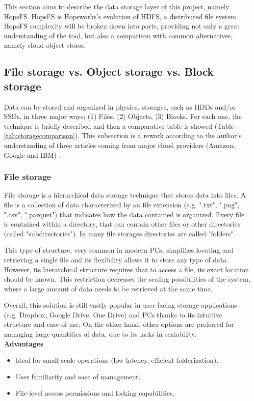 This section aims to describe the data storage layer of this project, namely HopsFS. HopsFS is Hopsworks's evolution of \gls{HDFS}, a distributed file system. HopsFS complexity will be broken down into parts, providing not only a great understanding of the tool, but also a comparison with common alternatives, namely cloud object stores.

\subsection{File storage vs. Object storage vs. Block storage}

Data can be stored and organized in physical storages, such as \glspl{HDD} and/or \glspl{SSD}, in three major ways: (1) Files, (2) Objects, (3) Blocks. For each one, the technique is briefly described and then a comparative table is showed (Table \ref{tab:storagecomparison}). This subsection is a rework according to the author's understanding of three articles coming from major cloud providers (Amazon, Google and IBM) \cite{BlockVsFile, HowObjectVs, ObjectVsFile2021}.

\subsubsection*{File storage}

File storage is a hierarchical data storage technique that stores data into files. A file is a collection of data characterized by an file extension (e.g. ".txt", ".png", ".csv", ".parquet") that indicates how the data contained is organized. Every file is contained within a directory, that can contain other files or other directories (called "subdirectories"). In many file storages directories are called "folders". 

This type of structure, very common in modern \glspl{PC}, simplifies locating and retrieving a single file and its flexibility allows it to store any type of data. However, its hierarchical structure requires that to access a file, its exact location should be known. This restriction decreases the scaling possibilities of the system, where a large amount of data needs to be retrieved at the same time.

Overall, this solution is still vastly popular in user-facing storage applications (e.g. Dropbox, Google Drive, One Drive) and \glspl{PC} thanks to its intuitive structure and ease of use. On the other hand, other options are preferred for managing large quantities of data, due to its lacks in scalability. \\[3mm]
\noindent\textbf{Advantages}
\begin{itemize}
    \item Ideal for small-scale operations (low latency, efficient folderization).
    \item User familiarity and ease of management.
    \item File-level access permissions and locking capabilities.
\end{itemize}

